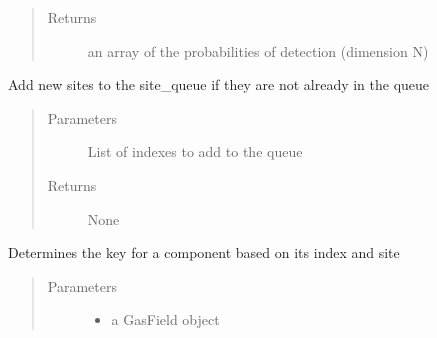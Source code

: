 \documentclass[letterpaper,10pt,english]{sphinxmanual}
\begin{document}
\begin{fulllineitems}
\begin{fulllineitems}
\begin{quote}
\begin{description}
\begin{itemize}
\end{itemize}

\item[{Returns}] \leavevmode
an array of the probabilities of detection (dimension N)

\end{description}\end{quote}

\end{fulllineitems}


\begin{fulllineitems}
\label{\detokenize{index:feast.DetectionModules.abstract_detection_method.DetectionMethod.extend_site_queue}}
Add new sites to the site\_queue if they are not already in the queue
\begin{quote}\begin{description}
\item[{Parameters}] \leavevmode
{} \textendash{} List of indexes to add to the queue

\item[{Returns}] \leavevmode
None

\end{description}\end{quote}

\end{fulllineitems}


\begin{fulllineitems}
\label{\detokenize{index:feast.DetectionModules.abstract_detection_method.DetectionMethod.find_comp_name}}
Determines the key for a component based on its index and site
\begin{quote}\begin{description}
\item[{Parameters}] \leavevmode\begin{itemize}
\item {} 
 \textendash{} a GasField object


\end{itemize}
\end{description}
\end{quote}
\end{fulllineitems}
\end{fulllineitems}
\end{document}
